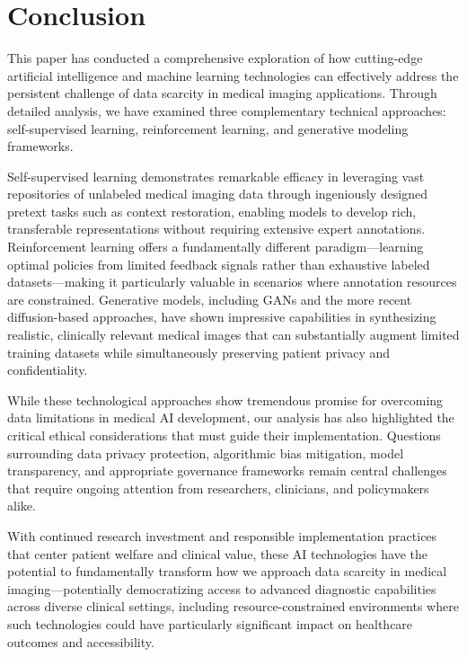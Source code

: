 \documentclass{article}
\begin{document}
\section{Conclusion}
\label{sec:conc}

This paper has conducted a comprehensive exploration of how cutting-edge artificial intelligence and machine learning technologies can effectively address the persistent challenge of data scarcity in medical imaging applications. Through detailed analysis, we have examined three complementary technical approaches: self-supervised learning, reinforcement learning, and generative modeling frameworks. 

Self-supervised learning demonstrates remarkable efficacy in leveraging vast repositories of unlabeled medical imaging data through ingeniously designed pretext tasks such as context restoration, enabling models to develop rich, transferable representations without requiring extensive expert annotations. Reinforcement learning offers a fundamentally different paradigm—learning optimal policies from limited feedback signals rather than exhaustive labeled datasets—making it particularly valuable in scenarios where annotation resources are constrained. Generative models, including GANs and the more recent diffusion-based approaches, have shown impressive capabilities in synthesizing realistic, clinically relevant medical images that can substantially augment limited training datasets while simultaneously preserving patient privacy and confidentiality.

While these technological approaches show tremendous promise for overcoming data limitations in medical AI development, our analysis has also highlighted the critical ethical considerations that must guide their implementation. Questions surrounding data privacy protection, algorithmic bias mitigation, model transparency, and appropriate governance frameworks remain central challenges that require ongoing attention from researchers, clinicians, and policymakers alike. 

With continued research investment and responsible implementation practices that center patient welfare and clinical value, these AI technologies have the potential to fundamentally transform how we approach data scarcity in medical imaging—potentially democratizing access to advanced diagnostic capabilities across diverse clinical settings, including resource-constrained environments where such technologies could have particularly significant impact on healthcare outcomes and accessibility.



\vfill\pagebreak



\end{document}
